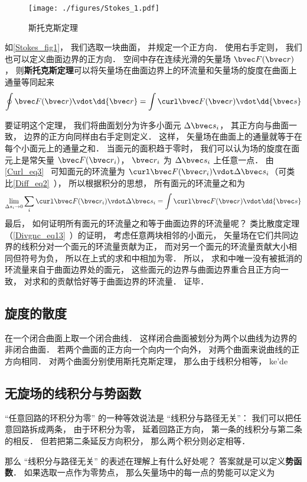 
\begin{issues}
\issueTODO
\end{issues}


\begin{figure}[ht]
\centering
\texttt{[image: ./figures/Stokes\_1.pdf]}
\caption{斯托克斯定理} \label{Stokes_fig1}
\end{figure}

如\autoref{Stokes_fig1}， 我们选取一块曲面， 并规定一个正方向． 使用右手定则， 我们也可以定义曲面边界的正方向． 空间中存在连续光滑的矢量场 $\bvec F(\bvec r)$， 则\textbf{斯托克斯定理}可以将矢量场在曲面边界上的环流量和矢量场的旋度在曲面上通量等同起来
\begin{equation}\label{Stokes_eq1}
\oint \bvec F(\bvec r) \vdot \dd{\bvec r} = \int \curl \bvec F(\bvec r) \vdot \dd{\bvec s}
\end{equation}

要证明这个定理， 我们将曲面划分为许多小面元 $\Delta \bvec s_i$， 其正方向与曲面一致， 边界的正方向同样由右手定则定义． 这样， 矢量场在曲面上的通量就等于在每个小面元上的通量之和． 当面元的面积趋于零时， 我们可以认为场的旋度在面元上是常矢量 $\bvec F(\bvec r_i)$， $\bvec r_i$ 为 $\Delta \bvec s_i$ 上任意一点． 由\autoref{Curl_eq3}~ 可知面元的环流量为 $\curl\bvec F(\bvec r_i) \vdot \Delta \bvec s_i$（可类比\autoref{Diff_eq2}~）， 所以根据积分的思想， 所有面元的环流量之和为
\begin{equation}
\lim_{\Delta s_i \to 0}\sum_i \curl\bvec F(\bvec r_i) \vdot \Delta \bvec s_i = \int \curl\bvec F(\bvec r) \vdot \dd{\bvec s}
\end{equation}
最后， 如何证明所有面元的环流量之和等于曲面边界的环流量呢？ 类比散度定理（\autoref{Divgnc_eq13}~）的证明， 考虑任意两块相邻的小面元， 矢量场在它们共同边界的线积分对一个面元的环流量贡献为正， 而对另一个面元的环流量贡献大小相同但符号为负， 所以在上式的求和中相加为零． 所以， 求和中唯一没有被抵消的环流量来自于曲面边界处的面元， 这些面元的边界与曲面边界重合且正方向一致， 对求和的贡献恰好等于曲面边界的环流量． 证毕．


\subsection{旋度的散度}
在一个闭合曲面上取一个闭合曲线． 这样闭合曲面被划分为两个以曲线为边界的非闭合曲面． 若两个曲面的正方向一个向内一个向外， 对两个曲面来说曲线的正方向相同． 对两个曲面分别使用斯托克斯定理， 那么由于线积分相等， ke'de

\subsection{无旋场的线积分与势函数}
“任意回路的环积分为零” 的一种等效说法是 “线积分与路径无关”： 我们可以把任意回路拆成两条， 由于环积分为零， 延着回路正方向， 第一条的线积分与第二条的相反． 但若把第二条延反方向积分， 那么两个积分则必定相等．

那么 “线积分与路径无关” 的表述在理解上有什么好处呢？ 答案就是可以定义\textbf{势函数}． 如果选取一点作为零势点， 那么矢量场中的每一点的势能可以定义为
